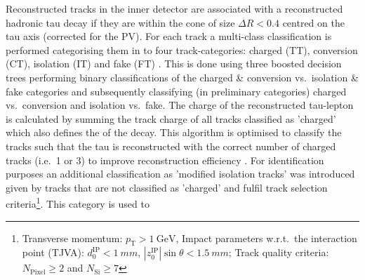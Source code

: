 %
Reconstructed tracks in the inner detector are associated with a reconstructed
hadronic tau decay if they are within the cone of size $\Delta R < 0.4$ centred
on the tau axis (corrected for the PV).
%
%
%
For each track a multi-class classification is performed categorising them in to
four track-categories: charged (TT), conversion (CT), isolation (IT) and fake
(FT) . This is done using
three boosted decision trees performing binary classifications of the charged \&
conversion vs.\ isolation \& fake categories and subsequently classifying (in
preliminary categories) charged vs.\ conversion and isolation vs.\ fake.
 The charge of the
reconstructed tau-lepton is calculated by summing the track charge of all tracks
classified as 'charged' which also defines the  of the decay.
This algorithm is optimised to classify the tracks such that the tau is
reconstructed with the correct number of charged tracks (i.e.\ 1 or 3) to
improve reconstruction efficiency . For identification purposes an additional
classification as 'modified isolation tracks' was introduced given by tracks
that are not classified as 'charged' and fulfil track selection
criteria\footnote{Transverse momentum:
  $p_\mathrm{T} > \SI{1}{\giga\electronvolt}$, Impact parameters w.r.t.\ the
  interaction point (TJVA): $d_0^\text{IP} < \SI{1}{mm}$,
  $|z_0^\text{IP}| \sin\theta < \SI{1.5}{mm}$; Track quality criteria:
  $N_\text{Pixel} \geq 2$ and $N_\text{Si} \geq 7$}. This category is used to
